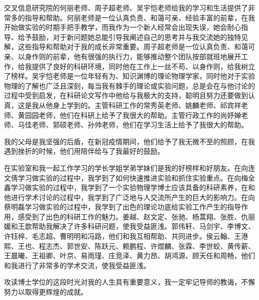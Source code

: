 \begin{acknowledgements}
  交叉信息研究院的何丽老师、周子超老师、吴宇恺老师给我的学习和生活提供了非常多的指导和帮助。何丽老师是一位认真负责、和蔼可亲、经验丰富的前辈，在我开始做实验的时期手把手教学，而我作为一个新人经常会出现失误，她会耐心指导、给予鼓励，对于新问题她总能引导我阐述自己的思考并与我交流她的独特见解，这些指导和帮助对于我的成长非常重要。周子超老师是一位认真负责、和蔼可亲、以身作则的前辈，他有很强的执行力，能够推动整个团队按部就班地展开工作，给我提供了良好的科研环境，同时他在工作上一丝不苟、以身作则，给我树立了榜样。吴宇恺老师是一位年轻有为、知识渊博的理论物理学家，同时他对于实验物理的了解也广泛且深刻，每当我有棘手的理论或实验问题，总是会在与他讨论的过程中受到启发，在科研论文写作中他给与我极大的支持，聪明且努力还要做到认真，这是我从他身上学到的。主管科研工作的常秀英老师、姚麟老师、祁宾祥老师、黄园园老师，他们在科研上给予了我很大的帮助。主管行政工作的尚妤婵老师、马佳老师、郭硕老师、孙帅老师，他们在学习生活上给予了我很大的帮助。

  我的父母是我坚强的后盾，在新冠疫情期间，他们给予了我无微不至的照顾，在我遇到挫折的时候，他们用陪伴给与了我最好的鼓励。

  在实验室和我一起工作学习的学长学姐学弟学妹们是我的好榜样和好朋友。在向连文倩学习做实验的过程中，我学到了如何快速推进实验和抓住实验重点。在向梅全鑫学习做实验的过程中，我学到了一个实验物理学博士应该具备的科研素养，在和他进行学术讨论的过程中，我学到了广泛地与人交流所产生的巨大的影响力。在向蔡明磊学习做实验的过程中，我学到了出色的理论功底给实验工作产生的指导作用，感受到了出色的科研工作的魅力。姜越、赵文定、张驰、杨蒿翔、张胜、仇丽媛和王歆帮助我解决了许多科研问题，使我受益匪浅。郭伟轩、马剑宇、李博文、许钰梓、毛志超、曹明明和冯路，他们和我互相帮助、共同进步。侯云翰、王港熙、王也、程志杰、郭世安、陈跃元、赖鹏程、许煜麟、张霖、李世蛟、黄传薪、王晨曦、王祖卿、叶京、易雨瑾、庄竞泽、黄力昂、胡鸿源、顾天任和周畅，他们和我进行了非常多的学术交流，使我受益匪浅。

  攻读博士学位的这段时光对我的人生具有重要意义，我一定牢记导师的教诲，不懈努力以取得更辉煌的成就。


\end{acknowledgements}

